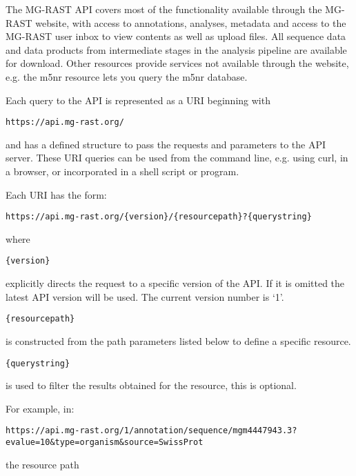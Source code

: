 The MG-RAST API covers most of the functionality available through the MG-RAST website, with access to annotations, analyses, metadata and access to the MG-RAST user inbox to view contents as well as upload files. All sequence data and data products from intermediate stages in the analysis pipeline are available for download. Other resources provide services not available through the website, e.g. the m5nr resource lets you query the m5nr database.

Each query to the API is represented as a URI beginning with
\begin{small}
\begin{verbatim}
https://api.mg-rast.org/
\end{verbatim}
\end{small} and has a defined structure to pass the requests and parameters to the API server. These URI queries can be used from the command line, e.g. using curl, in a browser, or incorporated in a shell script or program.

Each URI has the form:
\begin{small}
\begin{verbatim}
https://api.mg-rast.org/{version}/{resourcepath}?{querystring}
\end{verbatim}
\end{small} where

\begin{small}
\begin{verbatim}
{version}
\end{verbatim}
\end{small}
explicitly directs the request to a specific version of the API. If it is omitted the latest API version will be used. The current version number is `1'.

\begin{small}
\begin{verbatim}
{resourcepath}
\end{verbatim}
\end{small}
is constructed from the path parameters listed below to define a specific resource.

\begin{small}
\begin{verbatim}
{querystring}
\end{verbatim}
\end{small}
is used to filter the results obtained for the resource, this is optional.

For example, in:
\begin{small}
\begin{lstlisting}
https://api.mg-rast.org/1/annotation/sequence/mgm4447943.3?evalue=10&type=organism&source=SwissProt
\end{lstlisting}
\end{small} the resource path

